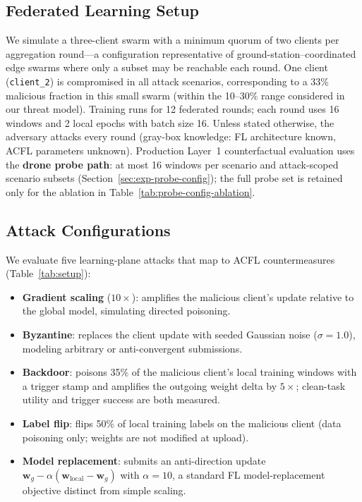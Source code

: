 \subsection{Federated Learning Setup}
\label{sec:exp-fl-setup}

We simulate a three-client swarm with a minimum quorum of two clients per aggregation round---a configuration representative of ground-station--coordinated edge swarms where only a subset may be reachable each round.
One client (\texttt{client\_2}) is compromised in all attack scenarios, corresponding to a 33\% malicious fraction in this small swarm (within the 10--30\% range considered in our threat model).
Training runs for 12 federated rounds; each round uses 16 windows and 2 local epochs with batch size 16.
Unless stated otherwise, the adversary attacks every round (gray-box knowledge: FL architecture known, ACFL parameters unknown).
Production Layer~1 counterfactual evaluation uses the \textbf{drone probe path}: at most 16 windows per scenario and attack-scoped scenario subsets (Section~\ref{sec:exp-probe-config}); the full probe set is retained only for the ablation in Table~\ref{tab:probe-config-ablation}.

\subsection{Attack Configurations}
\label{sec:exp-attacks}

We evaluate five learning-plane attacks that map to ACFL countermeasures (Table~\ref{tab:setup}):

\begin{itemize}
  \item \textbf{Gradient scaling} ($10\times$): amplifies the malicious client's update relative to the global model, simulating directed poisoning.
  \item \textbf{Byzantine}: replaces the client update with seeded Gaussian noise ($\sigma{=}1.0$), modeling arbitrary or anti-convergent submissions.
  \item \textbf{Backdoor}: poisons 35\% of the malicious client's local training windows with a trigger stamp and amplifies the outgoing weight delta by $5\times$; clean-task utility and trigger success are both measured.
  \item \textbf{Label flip}: flips 50\% of local training labels on the malicious client (data poisoning only; weights are not modified at upload).
  \item \textbf{Model replacement}: submits an anti-direction update $\mathbf{w}_g - \alpha(\mathbf{w}_{\mathrm{local}} - \mathbf{w}_g)$ with $\alpha{=}10$, a standard FL model-replacement objective distinct from simple scaling.
\end{itemize}

